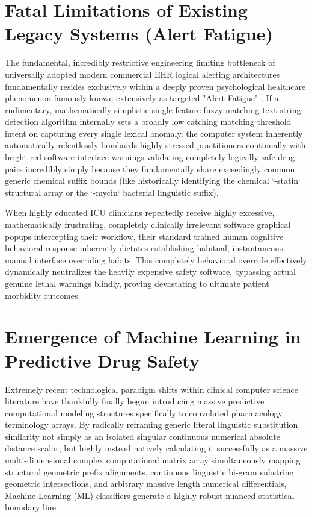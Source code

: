\documentclass[12pt,a4paper]{report}
\begin{document}
\section{Fatal Limitations of Existing Legacy Systems (Alert Fatigue)}
The fundamental, incredibly restrictive engineering limiting bottleneck of universally adopted modern commercial EHR logical alerting architectures fundamentally resides exclusively within a deeply proven psychological healthcare phenomenon famously known extensively as targeted "Alert Fatigue" \cite{bitan2004}. If a rudimentary, mathematically simplistic single-feature fuzzy-matching text string detection algorithm internally sets a broadly low catching matching threshold intent on capturing every single lexical anomaly, the computer system inherently automatically relentlessly bombards highly stressed practitioners continually with bright red software interface warnings validating completely logically safe drug pairs incredibly simply because they fundamentally share exceedingly common generic chemical suffix bounds (like historically identifying the chemical `-statin` structural array or the `-mycin` bacterial linguistic suffix).

When highly educated ICU clinicians repeatedly receive highly excessive, mathematically frustrating, completely clinically irrelevant software graphical popups intercepting their workflow, their standard trained human cognitive behavioral response inherently dictates establishing habitual, instantaneous manual interface overriding habits. This completely behavioral override effectively dynamically neutralizes the heavily expensive safety software, bypassing actual genuine lethal warnings blindly, proving devastating to ultimate patient morbidity outcomes.

\section{Emergence of Machine Learning in Predictive Drug Safety}
Extremely recent technological paradigm shifts within clinical computer science literature have thankfully finally begun introducing massive predictive computational modeling structures specifically to convoluted pharmacology terminology arrays. By radically reframing generic literal linguistic substitution similarity not simply as an isolated singular continuous numerical absolute distance scalar, but highly instead natively calculating it successfully as a massive multi-dimensional complex computational matrix array simultaneously mapping structural geometric prefix alignments, continuous linguistic bi-gram substring geometric intersections, and arbitrary massive length numerical differentials, Machine Learning (ML) classifiers generate a highly robust nuanced statistical boundary line.
\end{document}
